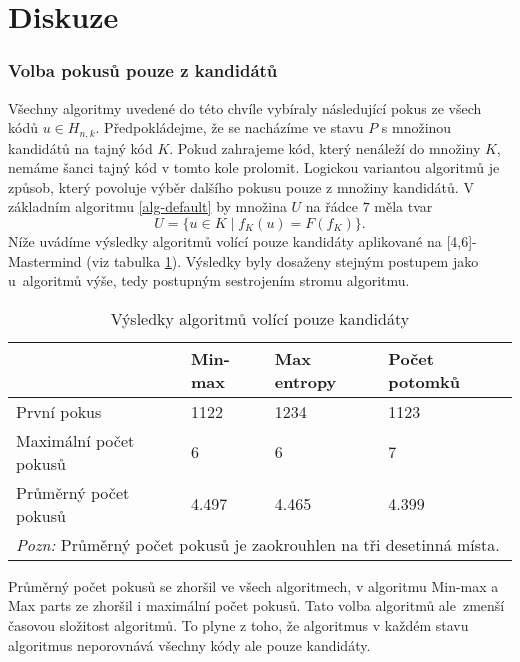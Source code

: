 
\section{Diskuze}
\subsubsection{Volba pokusů pouze z kandidátů}
Všechny algoritmy uvedené do této chvíle vybíraly následující pokus ze všech kódů $u\in H_{n,k}$. Předpokládejme, že se nacházíme ve stavu $P$ s množinou kandidátů na tajný kód $K$. Pokud zahrajeme kód, který nenáleží do množiny $K$, nemáme šanci tajný kód v tomto kole prolomit. Logickou variantou algoritmů je způsob, který povoluje výběr dalšího pokusu pouze z množiny kandidátů. V základním algoritmu \ref{alg-default} by množina $U$ na řádce $7$ měla tvar
\[U = \{u \in K \mid f_K(u) = F(f_K)\}.\]
Níže uvádíme výsledky algoritmů volící pouze kandidáty aplikované na [4,6]-Mastermind (viz tabulka \ref{tabpouzekandidati}). Výsledky byly dosaženy stejným postupem jako u~algoritmů výše, tedy postupným sestrojením stromu algoritmu. 

\begin{table}[h]
\centering
\begin{tabular}{l l l l}
\toprule
 & Min-max & Max entropy & Počet potomků  \\
\midrule
První pokus 
& 1122 & 1234 & 1123  \\

Maximální počet pokusů 
& 6 & 6 & 7  \\

Průměrný počet pokusů 
& 4.497 & 4.465 & 4.399 \\
\bottomrule
\multicolumn{4}{l}{\footnotesize \textit{Pozn:}
Průměrný počet pokusů je zaokrouhlen na tři desetinná místa.}
\end{tabular}
\caption{Výsledky algoritmů volící pouze kandidáty}\label{tabpouzekandidati}
\end{table}

Průměrný počet pokusů se zhoršil ve všech algoritmech, v algoritmu Min-max a Max parts ze zhoršil i maximální počet pokusů. Tato volba algoritmů ale~zmenší časovou složitost algoritmů. To plyne z toho, že algoritmus v každém stavu algoritmus neporovnává všechny kódy ale pouze kandidáty. 

